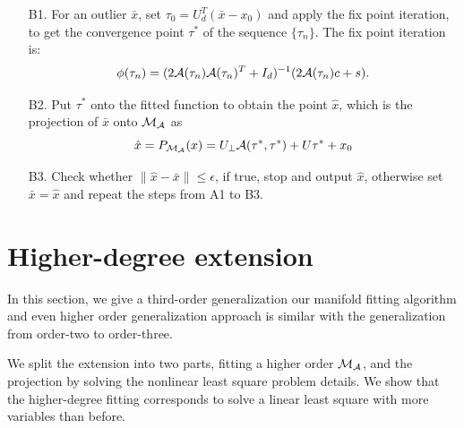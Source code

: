 \documentclass[aos,preprint]{imsart}
\theoremstyle{remark}
\begin{document}
\hspace{-4mm}{\it The projection procedure contains the following three steps:}
\begin{itemize}
\vspace{2mm}\item[B1.] For an outlier $\bar{x}$, set $\tau_0 = U_d^T(\bar{x}-x_0)$ and apply the fix point iteration, to get the convergence point $\tau^*$ of the sequence $\{\tau_n\}$. The fix point iteration is: 
\[
 \phi(\tau_{n})=( 2{\cal A}(\tau_{n}){\cal A}(\tau_{n})^T+ I_d)^{-1} (2{\cal A}(\tau_{n})c+ s).
\]
\item[B2.] Put $\tau^*$ onto the fitted function  to obtain the point $\hat{x}$, which is the projection of $\bar{x}$ onto ${\cal M}_{\cal A}$ as
\[
\hat{x} = P_{\cal M_A} (x) =  U_{\perp} {\cal A} (\tau^*,\tau^*) + U \tau^* +x_0
\]
\item[B3.] Check whether $\|\hat{x}-\bar{x}\|\leq \epsilon$, if true, stop and output $\hat{x}$, otherwise set $\bar{x}=\hat{x}$ and repeat the steps from A1 to B3.
\end{itemize}
\section{Higher-degree extension}
In this section, we give a third-order generalization our manifold fitting algorithm and even higher order generalization approach is similar with the generalization from order-two to order-three.

We split the extension into two parts, fitting a higher order $\cal M_A$, and the projection by solving the nonlinear least square problem details. We show that the higher-degree fitting corresponds to solve a linear least square with more variables than before. 
\end{document}
